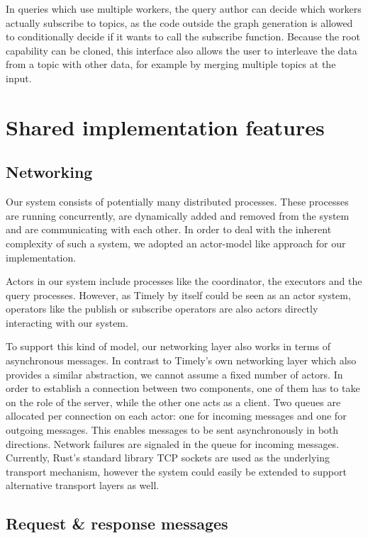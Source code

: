 In queries which use multiple workers, the query author can decide which workers
actually subscribe to topics, as the code outside the graph generation is allowed
to conditionally decide if it wants to call the subscribe function. Because
the root capability can be cloned, this interface also allows the user to
interleave the data from a topic with other data, for example by merging
multiple topics at the input.



\section{Shared implementation features}

\subsection{Networking}

Our system consists of potentially many distributed processes. These processes
are running concurrently, are dynamically added and removed from the system
and are communicating with each other. In order to deal with the inherent
complexity of such a system, we adopted an actor-model like approach for our
implementation.

Actors in our system include processes like the coordinator, the executors 
and the query processes. However, as Timely by itself could be seen as an
actor system, operators like the publish or subscribe operators are also actors
directly interacting with our system.

To support this kind of model, our networking layer also works in terms of
asynchronous messages. In contrast to Timely's own networking layer which also
provides a similar abstraction, we cannot assume a fixed number of actors.
In order to establish a connection between two components, one of them has to
take on the role of the server, while the other one acts as a client. Two
queues are allocated per connection on each actor: one for incoming messages
and one for outgoing messages. This enables messages to be sent asynchronously
in both directions. Network failures are signaled in the queue for incoming
messages. Currently, Rust's standard library TCP sockets are used as the
underlying transport mechanism, however the system could easily be extended to
support alternative transport layers as well.

\subsection{Request \& response messages} \label{sec:reqresp}

